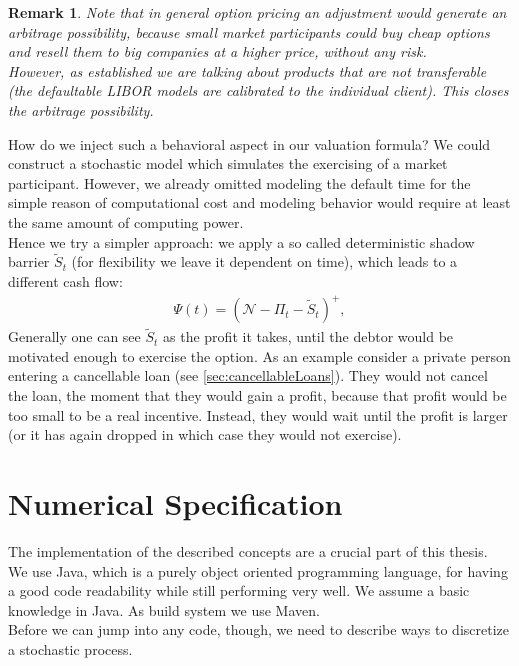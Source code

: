 \documentclass[12pt]{article}
\newtheorem{remark}[theorem]{Remark}
\begin{document}
	\begin{remark}
		Note that in general option pricing an adjustment would generate an arbitrage possibility, because small market participants could buy cheap options and resell them to big companies at a higher price, without any risk.\\
		However, as established we are talking about products that are not transferable (the defaultable LIBOR models are calibrated to the individual client). This closes the arbitrage possibility.
	\end{remark}
	
	How do we inject such a behavioral aspect in our valuation formula? We could construct a stochastic model which simulates the exercising of a market participant. However, we already omitted modeling the default time for the simple reason of computational cost and modeling behavior would require at least the same amount of computing power.\\
	Hence we try a simpler approach: we apply a so called deterministic shadow barrier $\tilde{S}_t$ (for flexibility we leave it dependent on time), which leads to a different cash flow:	
	\begin{align*}
		\Psi(t) = \left(\mathcal{N} - \Pi_t - \tilde{S}_t\right)^+,
	\end{align*}
	Generally one can see $\tilde{S}_t$ as the profit it takes, until the debtor would be motivated enough to exercise the option. As an example consider a private person entering a cancellable loan (see \cref{sec:cancellableLoans}). They would not cancel the loan, the moment that they would gain a profit, because that profit would be too small to be a real incentive. Instead, they would wait until the profit is larger (or it has again dropped in which case they would not exercise).
	
	
	
	
	
	\pagebreak
	\section{Numerical Specification}\label{sec:numerical}
	The implementation of the described concepts are a crucial part of this thesis.\\
	We use Java, which is a purely object oriented programming language, for having a good  code readability while still performing very well. We assume a basic knowledge in Java.
	As build system we use Maven.\\
	Before we can jump into any code, though, we need to describe ways to discretize a stochastic process.
	
\end{document}
